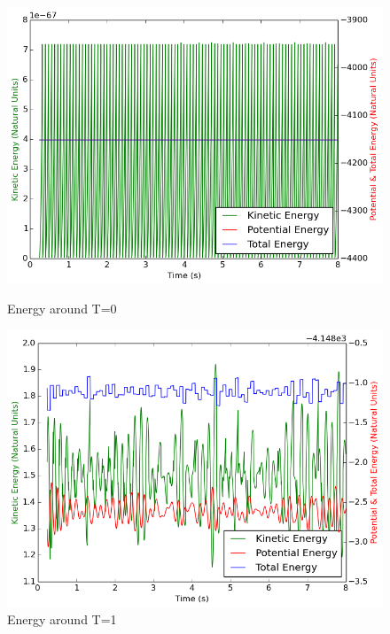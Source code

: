 \documentclass[10pt]{article}
\newcommand{\n}{\noindent}
\begin{document}
\begin{figure}[ht]
\centering
\begin{minipage}{.45\textwidth}
\centering
\includegraphics[width=1 \linewidth]{figures/energy0.png}
\caption{Energy around T=0}
\label{fig:figure3}
\end{minipage}\hfill
\quad	
\begin{minipage}{.45\textwidth}
\centering
\includegraphics[width=1 \linewidth]{figures/energy1.png}
\caption{Energy around T=1}
\label{fig:figure4}
\end{minipage}\hfill
\end{figure}
\n
\end{document}
